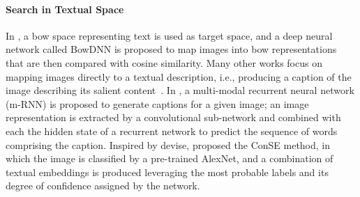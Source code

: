 \paragraph{Search in Textual Space}
In \cite{bai2014bag}, a \acrfull{bow} space representing text is used as target space, and a deep neural network called BowDNN is proposed to map images into \gls{bow} representations that are then compared with cosine similarity.
Many other works focus on mapping images directly to a textual description, i.e., producing a caption of the image describing its salient content~\cite{vinyals2015show,karpathy2015deep,fang2015captions}.
In \cite{mao2014deep}, a multi-modal recurrent neural network (m-RNN) is proposed to generate captions for a given image;
an image representation is extracted by a convolutional sub-network and combined with each the hidden state of a recurrent network to predict the sequence of words comprising the caption.
Inspired by \gls{devise}, \citet{norouzi2013zero} proposed the ConSE method, in which the image is classified by a pre-trained AlexNet, and a combination of textual embeddings is produced leveraging the most probable labels and its degree of confidence assigned by the network.

